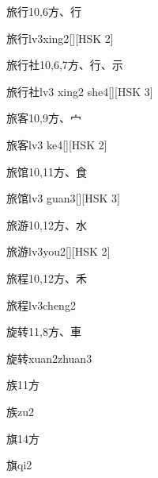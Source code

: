 \begin{entry}{旅行}{10,6}{⽅、⾏}
  \begin{phonetics}{旅行}{lv3xing2}[][HSK 2]
  \end{phonetics}
\end{entry}

\begin{entry}{旅行社}{10,6,7}{⽅、⾏、⽰}
  \begin{phonetics}{旅行社}{lv3 xing2 she4}[][HSK 3]
  \end{phonetics}
\end{entry}

\begin{entry}{旅客}{10,9}{⽅、⼧}
  \begin{phonetics}{旅客}{lv3 ke4}[][HSK 2]
  \end{phonetics}
\end{entry}

\begin{entry}{旅馆}{10,11}{⽅、⾷}
  \begin{phonetics}{旅馆}{lv3 guan3}[][HSK 3]
  \end{phonetics}
\end{entry}

\begin{entry}{旅游}{10,12}{⽅、⽔}
  \begin{phonetics}{旅游}{lv3you2}[][HSK 2]
  \end{phonetics}
\end{entry}

\begin{entry}{旅程}{10,12}{⽅、⽲}
  \begin{phonetics}{旅程}{lv3cheng2}
  \end{phonetics}
\end{entry}

\begin{entry}{旋转}{11,8}{⽅、⾞}
  \begin{phonetics}{旋转}{xuan2zhuan3}
  \end{phonetics}
\end{entry}

\begin{entry}{族}{11}{⽅}
  \begin{phonetics}{族}{zu2}
  \end{phonetics}
\end{entry}

\begin{entry}{旗}{14}{⽅}
  \begin{phonetics}{旗}{qi2}
  \end{phonetics}
\end{entry}



